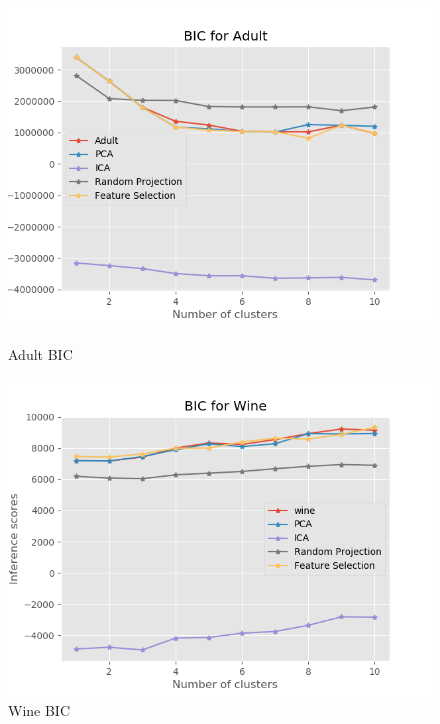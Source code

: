 \documentclass[11pt]{article}
\begin{document}
\begin{figure}[!htb]
   \begin{minipage}{0.5\textwidth}
     \centering
     \includegraphics[width=1.2\linewidth]{../figures/cluster_em_bic_adult.png}
     \caption{Adult BIC}\label{Fig:cluster_em_bic_adult}
   \end{minipage}\hfill
   \begin{minipage}{0.5\textwidth}
     \centering
     \includegraphics[width=1.2\linewidth]{../figures/cluster_em_bic_wine.png}
  \caption{Wine BIC}
  \label{Fig:cluster_em_bic_wine}
   \end{minipage}
\end{figure}
\end{document}

